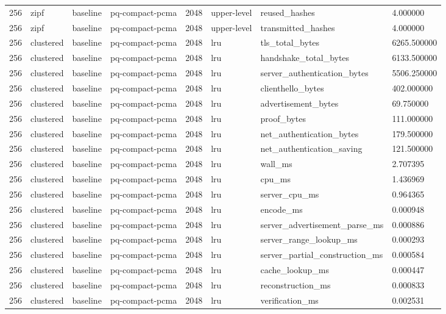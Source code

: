 \begin{tabular}{llllllll}
256 & zipf & baseline & pq-compact-pcma & 2048 & upper-level & reused\_hashes & 4.000000 \\
256 & zipf & baseline & pq-compact-pcma & 2048 & upper-level & transmitted\_hashes & 4.000000 \\
256 & clustered & baseline & pq-compact-pcma & 2048 & lru & tls\_total\_bytes & 6265.500000 \\
256 & clustered & baseline & pq-compact-pcma & 2048 & lru & handshake\_total\_bytes & 6133.500000 \\
256 & clustered & baseline & pq-compact-pcma & 2048 & lru & server\_authentication\_bytes & 5506.250000 \\
256 & clustered & baseline & pq-compact-pcma & 2048 & lru & clienthello\_bytes & 402.000000 \\
256 & clustered & baseline & pq-compact-pcma & 2048 & lru & advertisement\_bytes & 69.750000 \\
256 & clustered & baseline & pq-compact-pcma & 2048 & lru & proof\_bytes & 111.000000 \\
256 & clustered & baseline & pq-compact-pcma & 2048 & lru & net\_authentication\_bytes & 179.500000 \\
256 & clustered & baseline & pq-compact-pcma & 2048 & lru & net\_authentication\_saving & 121.500000 \\
256 & clustered & baseline & pq-compact-pcma & 2048 & lru & wall\_ms & 2.707395 \\
256 & clustered & baseline & pq-compact-pcma & 2048 & lru & cpu\_ms & 1.436969 \\
256 & clustered & baseline & pq-compact-pcma & 2048 & lru & server\_cpu\_ms & 0.964365 \\
256 & clustered & baseline & pq-compact-pcma & 2048 & lru & encode\_ms & 0.000948 \\
256 & clustered & baseline & pq-compact-pcma & 2048 & lru & server\_advertisement\_parse\_ms & 0.000886 \\
256 & clustered & baseline & pq-compact-pcma & 2048 & lru & server\_range\_lookup\_ms & 0.000293 \\
256 & clustered & baseline & pq-compact-pcma & 2048 & lru & server\_partial\_construction\_ms & 0.000584 \\
256 & clustered & baseline & pq-compact-pcma & 2048 & lru & cache\_lookup\_ms & 0.000447 \\
256 & clustered & baseline & pq-compact-pcma & 2048 & lru & reconstruction\_ms & 0.000833 \\
256 & clustered & baseline & pq-compact-pcma & 2048 & lru & verification\_ms & 0.002531 \\

\end{tabular}
